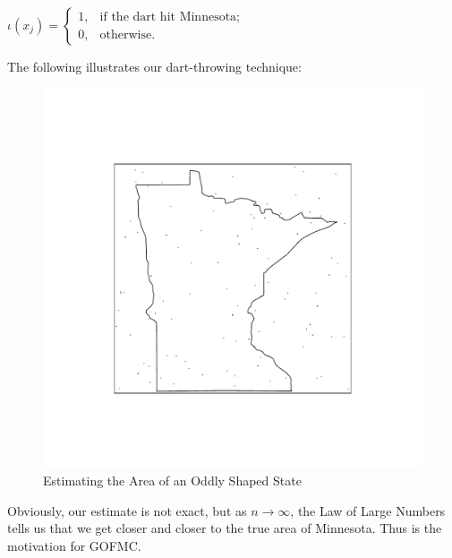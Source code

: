 \documentclass[12pt,twoside]{reedthesis}
\begin{document}
			\begin{center}
		 	$\iota(x_j) = 
			\begin{cases} 1, & \text{if the dart hit Minnesota}; \\
			0, & \text{otherwise}. \end{cases}$
			 \end {center}
			The following illustrates our dart-throwing technique:
			
			\begin{figure}[h]
		       	\centering
		    	\includegraphics[clip=true, viewport=.3in 1in 6in 6in,scale=0.5]{mn_box_pts}
		     	\caption{Estimating the Area of an Oddly Shaped State}
	 		\label{subd}
			\end{figure}	

			Obviously, our estimate is not exact, but as $n \rightarrow \infty$, the Law of Large Numbers tells us that we get closer and closer to the true area of Minnesota. Thus is the motivation for GOFMC.
\end{document}
